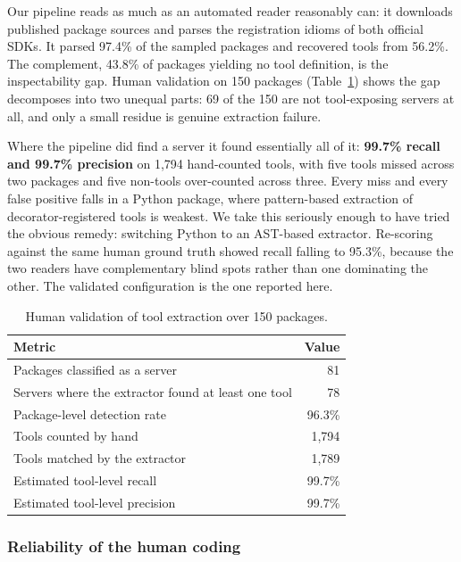 \documentclass[a4paper,fleqn]{cas-dc}
\begin{document}
Our pipeline reads as much as an automated reader reasonably can: it downloads
published package sources and parses the registration idioms of both official
SDKs. It
parsed 97.4\% of the sampled packages and recovered tools from 56.2\%. The
complement, 43.8\% of packages yielding no tool definition, is the
inspectability gap. Human validation on 150 packages (Table~\ref{tab:rq4})
shows the gap decomposes into two unequal parts: 69 of the 150 are not
tool-exposing servers at all, and only a small residue is genuine extraction
failure.

Where the pipeline did find a server it found essentially all of it:
\textbf{99.7\% recall and 99.7\% precision} on 1,794 hand-counted tools, with
five tools missed across two packages and five non-tools over-counted across
three. Every miss and every false positive falls in a Python package, where
pattern-based extraction of decorator-registered tools is weakest. We take this
seriously enough to have tried the obvious remedy: switching Python to an
AST-based extractor. Re-scoring against the same human ground truth showed
recall falling to 95.3\%, because the two readers have complementary blind
spots rather than one dominating the other. The validated configuration is the
one reported here.

\begin{table}[t]
\caption{Human validation of tool extraction over 150 packages.}
\label{tab:rq4}
\centering
\begin{tabular}{@{}lr@{}}
\toprule
Metric & Value \\
\midrule
Packages classified as a server & 81 \\
Servers where the extractor found at least one tool & 78 \\
Package-level detection rate & 96.3\% \\
Tools counted by hand & 1,794 \\
Tools matched by the extractor & 1,789 \\
Estimated tool-level recall & 99.7\% \\
Estimated tool-level precision & 99.7\% \\
\bottomrule
\end{tabular}
\end{table}

\subsubsection{Reliability of the human coding}\label{sec:reliability}
\end{document}
